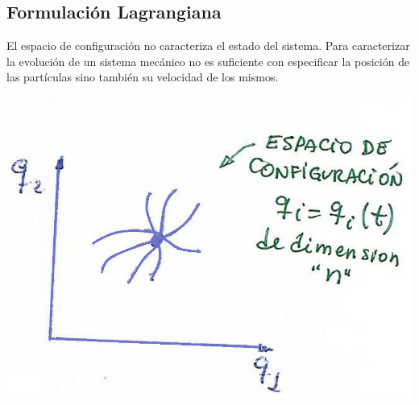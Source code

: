 \documentclass[../main]{subfiles}
\begin{document}
\subsection{Formulación Lagrangiana}
\begin{minipage}{0.6\textwidth}
    El espacio de configuración no caracteriza el estado del sistema. Para caracterizar la evolución de un sistema mecánico no es suficiente con especificar la posición de las partículas sino también su velocidad de los mismos.
\end{minipage}
\begin{minipage}{0.4\textwidth}
    \begin{center}
        \includegraphics[scale=0.3]{figs/img3.1.PNG}
    \end{center}
\end{minipage}
\end{document}
